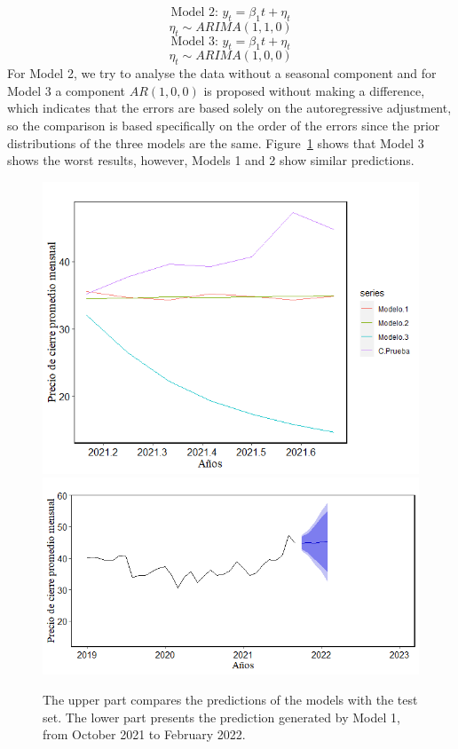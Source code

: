 $$\text{Model 2: } y_t = \beta_1 t+\eta_t$$
$$\eta_t \sim ARIMA(1,1,0)$$
$$\text{Model 3: } y_t = \beta_1 t+\eta_t$$
$$\eta_t \sim ARIMA(1,0,0)$$
%
For Model 2, we try to analyse the data without a seasonal component and for Model 3 a component $ AR (1,0,0) $ is proposed without making a difference, which indicates that the errors are based solely on the autoregressive adjustment, so the comparison is based specifically on the order of the errors since the prior distributions of the three models are the same. Figure~\ref{fig:comp3} shows that Model 3 shows the worst results, however, Models 1 and 2 show similar predictions.
%
\begin{figure}[ht]\centering
	\includegraphics[scale=0.5]{Figs/e}\\
	\includegraphics[scale=0.5]{Figs/f}
	\caption{The upper part compares the predictions of the models with the test set. The lower part presents the prediction generated by Model 1, from October 2021 to February 2022.} \label{fig:comp3}
\end{figure}
